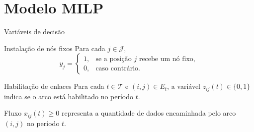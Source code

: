 \documentclass[11pt,brazil]{beamer}
\begin{document}
\section{Modelo MILP}

\begin{frame}{Variáveis de decisão}
  \begin{block}{Instalação de nós fixos}
    Para cada $j\in\mathcal J$,
    \[
      y_j=\begin{cases}
        1,&\text{se a posição $j$ recebe um nó fixo},\\
        0,&\text{caso contrário}.
      \end{cases}
    \]
  \end{block}
  \begin{block}{Habilitação de enlaces}
    Para cada $t\in\mathcal T$ e $(i,j)\in E_t$, a variável
    $z_{ij}(t)\in\{0,1\}$ indica se o arco está habilitado no período $t$.
  \end{block}
  \begin{block}{Fluxo}
    $x_{ij}(t)\ge0$ representa a quantidade de dados encaminhada pelo arco $(i,j)$ no período $t$.
  \end{block}
\end{frame}
\end{document}
